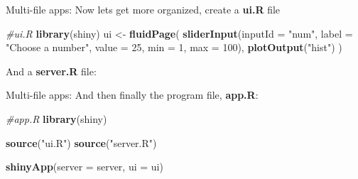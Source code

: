 \documentclass[
  ignorenonframetext,
]{beamer}
\newenvironment{Shaded}{\begin{snugshade}}{\end{snugshade}}
\newcommand{\AttributeTok}[1]{\textcolor[rgb]{0.13,0.29,0.53}{#1}}
\newcommand{\CommentTok}[1]{\textcolor[rgb]{0.56,0.35,0.01}{\textit{#1}}}
\newcommand{\ControlFlowTok}[1]{\textcolor[rgb]{0.13,0.29,0.53}{\textbf{#1}}}
\newcommand{\DecValTok}[1]{\textcolor[rgb]{0.00,0.00,0.81}{#1}}
\newcommand{\FunctionTok}[1]{\textcolor[rgb]{0.13,0.29,0.53}{\textbf{#1}}}
\newcommand{\NormalTok}[1]{#1}
\newcommand{\OtherTok}[1]{\textcolor[rgb]{0.56,0.35,0.01}{#1}}
\newcommand{\SpecialCharTok}[1]{\textcolor[rgb]{0.81,0.36,0.00}{\textbf{#1}}}
\newcommand{\StringTok}[1]{\textcolor[rgb]{0.31,0.60,0.02}{#1}}
\begin{document}
\begin{frame}[fragile]{Multi-file apps:}
\label{multi-file-apps}
Now lets get more organized, create a \textbf{ui.R} file \footnotesize

\begin{Shaded}
\begin{Highlighting}[]
\CommentTok{\#ui.R}
\FunctionTok{library}\NormalTok{(shiny)}
\NormalTok{ui }\OtherTok{\textless{}{-}} \FunctionTok{fluidPage}\NormalTok{(}
  \FunctionTok{sliderInput}\NormalTok{(}\AttributeTok{inputId =} \StringTok{"num"}\NormalTok{,}
    \AttributeTok{label =} \StringTok{"Choose a number"}\NormalTok{,}
    \AttributeTok{value =} \DecValTok{25}\NormalTok{, }\AttributeTok{min =} \DecValTok{1}\NormalTok{, }\AttributeTok{max =} \DecValTok{100}\NormalTok{), }
  \FunctionTok{plotOutput}\NormalTok{(}\StringTok{"hist"}\NormalTok{)}
\NormalTok{  )}
\end{Highlighting}
\end{Shaded}

\normalsize

And a \textbf{server.R} file: \footnotesize

\begin{Shaded}
\end{Shaded}
\end{frame}

\begin{frame}[fragile]{Multi-file apps:}
\label{multi-file-apps-1}
And then finally the program file, \textbf{app.R}:

\begin{Shaded}
\begin{Highlighting}[]
\CommentTok{\#app.R}
\FunctionTok{library}\NormalTok{(shiny)}

\FunctionTok{source}\NormalTok{(}\StringTok{"ui.R"}\NormalTok{)}
\FunctionTok{source}\NormalTok{(}\StringTok{"server.R"}\NormalTok{)}

\FunctionTok{shinyApp}\NormalTok{(}\AttributeTok{server =}\NormalTok{ server, }\AttributeTok{ui =}\NormalTok{ ui)}
\end{Highlighting}
\end{Shaded}
\end{frame}
\end{document}
